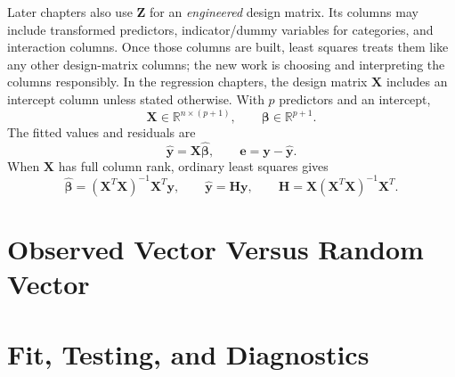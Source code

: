 {{Later chapters also use $\mathbf{Z}$ for an \emph{engineered} design matrix.  Its columns may include transformed predictors, indicator/dummy variables for categories, and interaction columns.  Once those columns are built, least squares treats them like any other design-matrix columns; the new work is choosing and interpreting the columns responsibly.
}{
In the regression chapters, the design matrix $\mathbf{X}$ includes an intercept column unless stated otherwise.  With $p$ predictors and an intercept,
\[
  \mathbf{X}\in\mathbb{R}^{n\times(p+1)},
  \qquad
  \boldsymbol{\beta}\in\mathbb{R}^{p+1}.
\]
The fitted values and residuals are
\[
  \widehat{\mathbf{y}}=\mathbf{X}\widehat{\boldsymbol{\beta}},
  \qquad
  \mathbf{e}=\mathbf{y}-\widehat{\mathbf{y}}.
\]
When \(\mathbf{X}\) has full column rank, ordinary least squares gives
\[
  \widehat{\boldsymbol{\beta}}
  =(\mathbf{X}^T\mathbf{X})^{-1}\mathbf{X}^T\mathbf{y},
  \qquad
  \widehat{\mathbf{y}}=\mathbf{H}\mathbf{y},
  \qquad
  \mathbf{H}=\mathbf{X}(\mathbf{X}^T\mathbf{X})^{-1}\mathbf{X}^T.
\]
}

\section*{Observed Vector Versus Random Vector}


\section*{Fit, Testing, and Diagnostics}

}
